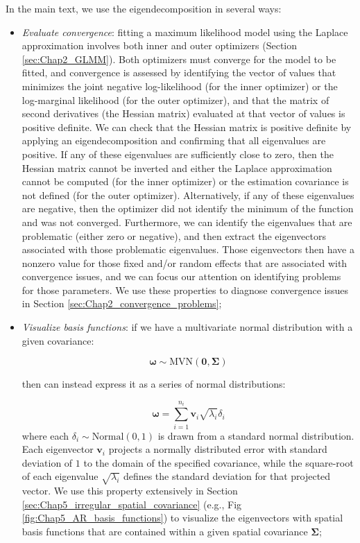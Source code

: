 In the main text, we use the eigendecomposition in several ways:
\begin{itemize}
    \item \textit{Evaluate convergence}:  fitting a maximum likelihood model using the Laplace approximation involves both inner and outer optimizers (Section \ref{sec:Chap2_GLMM}).  Both optimizers must converge for the model to be fitted, and convergence is assessed by identifying the vector of values that minimizes the joint negative log-likelihood (for the inner optimizer) or the log-marginal likelihood (for the outer optimizer), and that the matrix of second derivatives (the Hessian matrix) evaluated at that vector of values is positive definite.  We can check that the Hessian matrix is positive definite by applying an eigendecomposition and confirming that all eigenvalues are positive.  If any of these eigenvalues are sufficiently close to zero, then the Hessian matrix cannot be inverted and either the Laplace approximation cannot be computed (for the inner optimizer) or the estimation covariance is not defined (for the outer optimizer).  Alternatively, if any of these eigenvalues are negative, then the optimizer did not identify the minimum of the function and was not converged.  Furthermore, we can identify the eigenvalues that are problematic (either zero or negative), and then extract the eigenvectors associated with those problematic eigenvalues.  Those eigenvectors then have a nonzero value for those fixed and/or random effects that are associated with convergence issues, and we can focus our attention on identifying problems for those parameters.  We use these properties to diagnose convergence issues in Section \ref{sec:Chap2_convergence_problems}; 
    
    \item \textit{Visualize basis functions}:  if we have a multivariate normal distribution with a given covariance:

    \begin{equation}
        \mathbf{\omega} \sim \mathrm{MVN}(\mathbf{0,\Sigma})
    \end{equation}

    then can instead express it as a series of normal distributions:
    
    \begin{equation}
        \mathbf{\omega} = \sum_{i=1}^{n_i} \mathbf{v}_i \sqrt{\lambda_i} \delta_i
    \end{equation}
    where each \( \delta_i \sim \mathrm{Normal}(0,1) \) is drawn from a standard normal distribution.  Each eigenvector \(\mathbf{v}_i\) projects a normally distributed error with standard deviation of \(1\) to the domain of the specified covariance, while the square-root of each eigenvalue \(\sqrt{\lambda_i}\) defines the standard deviation for that projected vector.  We use this property extensively in Section \ref{sec:Chap5_irregular_spatial_covariance} (e.g., Fig \ref{fig:Chap5_AR_basis_functions}) to visualize the eigenvectors with spatial basis functions that are contained within a given spatial covariance \(\mathbf{\Sigma}\); 


\end{itemize}
